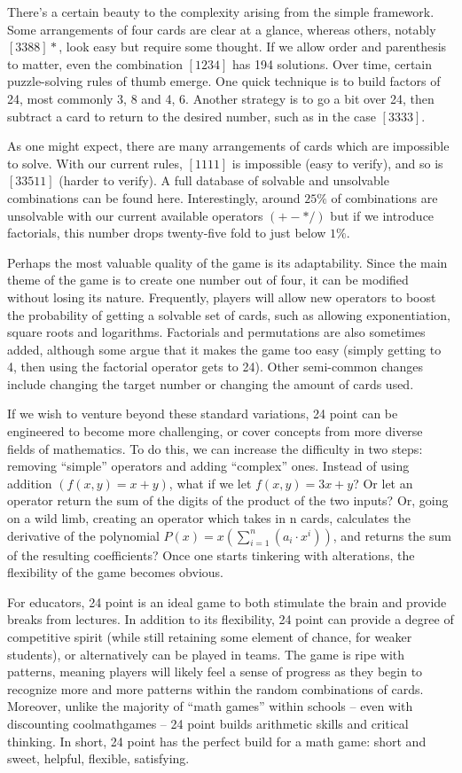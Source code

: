 \documentclass{article}
\begin{document}
There’s a certain beauty to the complexity arising from the simple framework. Some arrangements of four cards are clear at a glance, whereas others, notably $[3 3 8 8]*$, look easy but require some thought. If we allow order and parenthesis to matter, even the combination $[1 2 3 4]$ has 194 solutions. Over time, certain puzzle-solving rules of thumb emerge. One quick technique is to build factors of 24, most commonly 3, 8 and 4, 6. Another strategy is to go a bit over 24, then subtract a card to return to the desired number, such as in the case $[3 3 3 3]$.

As one might expect, there are many arrangements of cards which are impossible to solve. With our current rules, $[1 1 1 1]$ is impossible (easy to verify), and so is $[3 3 5 11]$ (harder to verify). A full database of solvable and unsolvable combinations can be found here. Interestingly, around $25\%$ of combinations are unsolvable with our current available operators $(+ - * /)$ but if we introduce factorials, this number drops twenty-five fold to just below $1\%$. 

Perhaps the most valuable quality of the game is its adaptability. Since the main theme of the game is to create one number out of four, it can be modified without losing its nature. Frequently, players will allow new operators to boost the probability of getting a solvable set of cards, such as allowing exponentiation, square roots and logarithms. Factorials and permutations are also sometimes added, although some argue that it makes the game too easy (simply getting to 4, then using the factorial operator gets to 24). Other semi-common changes include changing the target number or changing the amount of cards used.

If we wish to venture beyond these standard variations, 24 point can be engineered to become more challenging, or cover concepts from more diverse fields of mathematics. To do this, we can increase the difficulty in two steps: removing “simple” operators and adding “complex” ones. Instead of using addition $(f(x,y) = x+y)$, what if we let $f(x,y) = 3x+y$? Or let an operator return the sum of the digits of the product of the two inputs? Or, going on a wild limb, creating an operator which takes in n cards, calculates the derivative of the polynomial $P(x) = x(\sum_{i=1}^n (a_i \cdot x^i))$, and returns the sum of the resulting coefficients? Once one starts tinkering with alterations, the flexibility of the game becomes obvious.

For educators, 24 point is an ideal game to both stimulate the brain and provide breaks from lectures. In addition to its flexibility, 24 point can provide a degree of competitive spirit (while still retaining some element of chance, for weaker students), or alternatively can be played in teams. The game is ripe with patterns, meaning players will likely feel a sense of progress as they begin to recognize more and more patterns within the random combinations of cards. Moreover, unlike the majority of “math games” within schools – even with discounting coolmathgames – 24 point builds arithmetic skills and critical thinking. In short, 24 point has the perfect build for a math game: short and sweet, helpful, flexible, satisfying.
\end{document}
